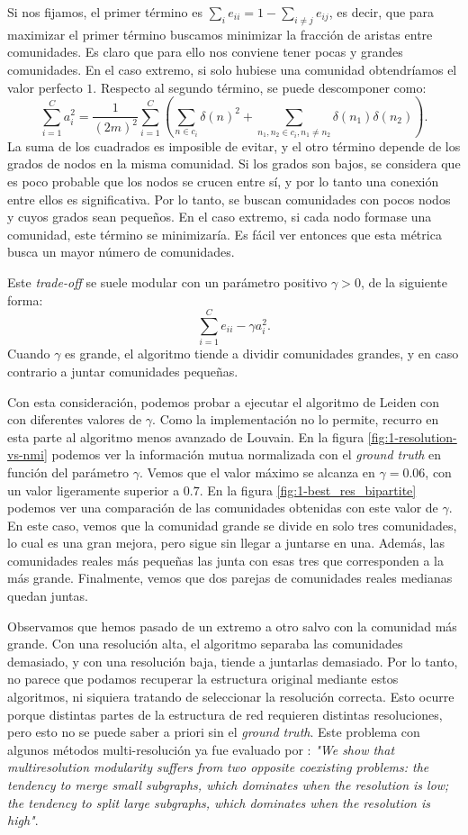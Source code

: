 Si nos fijamos, el primer término es $\sum_i e_{ii} = 1 - \sum_{i\neq j}
e_{ij}$, es decir, que para maximizar el primer término buscamos minimizar la
fracción de aristas entre comunidades. Es claro que para ello nos conviene
tener pocas y grandes comunidades. En el caso extremo, si solo hubiese una
comunidad obtendríamos el valor perfecto $1$. Respecto al segundo término, se
puede descomponer como:
$$
\sum_{i=1}^C a_i^2 =
\frac{1}{(2m)^2} \sum_{i=1}^C \left( \sum_{n \in c_i} \delta(n)^2 + \sum_{n_1, n_2 \in c_i, n_1 \neq n_2} \delta(n_1) \delta(n_2) \right) 
.$$
La suma de los cuadrados es imposible de evitar, y el otro término depende de
los grados de nodos en la misma comunidad. Si los grados son bajos, se
considera que es poco probable que los nodos se crucen entre sí, y por lo tanto
una conexión entre ellos es significativa. Por lo tanto, se buscan comunidades
con pocos nodos y cuyos grados sean pequeños. En el caso extremo, si cada nodo
formase una comunidad, este término se minimizaría. Es fácil ver entonces que
esta métrica busca un mayor número de comunidades.

Este \emph{trade-off} se suele modular con un parámetro positivo $\gamma > 0$,
de la siguiente forma:
$$
\sum_{i=1}^C e_{ii} - \gamma a_i^2
.$$
Cuando $\gamma$ es grande, el algoritmo tiende a dividir comunidades grandes, y
en caso contrario a juntar comunidades pequeñas.

Con esta consideración, podemos probar a ejecutar el algoritmo de Leiden con
con diferentes valores de $\gamma$. Como la implementación no lo permite,
recurro en esta parte al algoritmo menos avanzado de Louvain. En la figura
\ref{fig:1-resolution-vs-nmi} podemos ver la información mutua normalizada con
el \emph{ground truth} en función del parámetro $\gamma$. Vemos que el valor
máximo se alcanza en $\gamma = 0.06$, con un valor ligeramente
superior a $0.7$. En la figura \ref{fig:1-best_res_bipartite} podemos ver una
comparación de las comunidades obtenidas con este valor de $\gamma$. En este caso,
vemos que la comunidad grande se divide en solo tres comunidades, lo cual es una
gran mejora, pero sigue sin llegar a juntarse en una. Además, las comunidades
reales más pequeñas las junta con esas tres que corresponden a la más grande.
Finalmente, vemos que dos parejas de comunidades reales medianas quedan juntas.

Observamos que hemos pasado de un extremo a otro salvo con la comunidad más
grande. Con una resolución alta, el algoritmo separaba las comunidades
demasiado, y con una resolución baja, tiende a juntarlas demasiado. Por lo
tanto, no parece que podamos recuperar la estructura original mediante estos
algoritmos, ni siquiera tratando de seleccionar la resolución correcta. Esto
ocurre porque distintas partes de la estructura de red requieren distintas
resoluciones, pero esto no se puede saber a priori sin el \emph{ground truth}.
Este problema con algunos métodos multi-resolución ya fue evaluado por
\citeauthor{lancichinetti2011Limitsmodularity}
\cite{lancichinetti2011Limitsmodularity}: \emph{"We show that multiresolution
modularity suffers from two opposite coexisting problems: the tendency to merge
small subgraphs, which dominates when the resolution is low; the tendency to
split large subgraphs, which dominates when the resolution is high"}.

